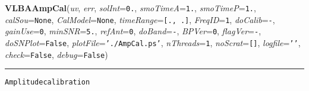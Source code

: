     \label{VLBACal:VLBAAmpCal}
    \vspace{0.5ex}

    \begin{boxedminipage}{\textwidth}

    \raggedright \textbf{VLBAAmpCal}(\textit{uv}, \textit{err}, \textit{solInt}=\texttt{0\-.\-}, \textit{smoTimeA}=\texttt{1\-.\-}, \textit{smoTimeP}=\texttt{1\-.\-}, \textit{calSou}=\texttt{N\-o\-n\-e\-}, \textit{CalModel}=\texttt{N\-o\-n\-e\-}, \textit{timeRange}=\texttt{[\-.\-,\-~\-.\-]\-}, \textit{FreqID}=\texttt{1\-}, \textit{doCalib}=\texttt{-\-}, \textit{gainUse}=\texttt{0\-}, \textit{minSNR}=\texttt{5\-.\-}, \textit{refAnt}=\texttt{0\-}, \textit{doBand}=\texttt{-\-}, \textit{BPVer}=\texttt{0\-}, \textit{flagVer}=\texttt{-\-}, \textit{doSNPlot}=\texttt{F\-a\-l\-s\-e\-}, \textit{plotFile}=\texttt{'\-.\-/\-A\-m\-p\-C\-a\-l\-.\-p\-s\-'\-}, \textit{nThreads}=\texttt{1\-}, \textit{noScrat}=\texttt{[\-]\-}, \textit{logfile}=\texttt{'\-'\-}, \textit{check}=\texttt{F\-a\-l\-s\-e\-}, \textit{debug}=\texttt{F\-a\-l\-s\-e\-})

    \vspace{-1.5ex}

    \rule{\textwidth}{0.5\fboxrule}
\begin{alltt}
Amplitude calibration


\end{alltt}
\end{boxedminipage}
